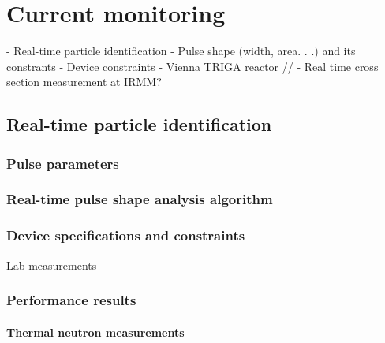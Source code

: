 \chapter{Current monitoring}
	- Real-time particle identification
		- Pulse shape (width, area. . .) and its constrants
		- Device constraints
		- Vienna TRIGA reactor
//		- Real time cross section measurement at IRMM?

\section{Real-time particle identification}
\subsection{Pulse parameters}
\subsection{Real-time pulse shape analysis algorithm}
\subsection{Device specifications and constraints}
Lab measurements
\subsection{Performance results}
\subsubsection{Thermal neutron measurements}


